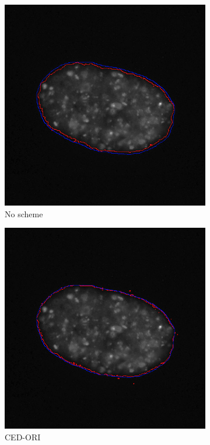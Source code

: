 \documentclass[a4paper,11pt]{ijamas}
\begin{document}
{\begin{figure}
\begin{subfigure}{.25\textwidth}
  \centering
  \includegraphics[width=0.80\columnwidth]{./figs/results/5no.jpg}
 \caption{No scheme}
  \label{fig:noseg_5}
\end{subfigure}%
\begin{subfigure}{.25\textwidth}
  \centering
  \includegraphics[width=0.80\columnwidth]{./figs/results/5ced.jpg}
 \caption{CED-ORI}
  \label{fig:cedseg_5}
\end{subfigure}%
\begin{subfigure}{.25\textwidth}
  \centering

\end{subfigure}
\end{figure}}
\end{document}

